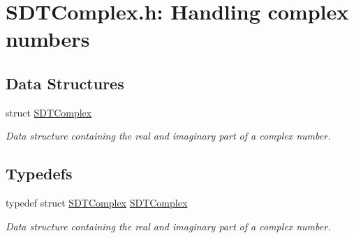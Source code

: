 \hypertarget{group__complex}{}\section{S\+D\+T\+Complex.\+h\+: Handling complex numbers}
\label{group__complex}
\subsection*{Data Structures}
\begin{DoxyCompactItemize}
\item 
struct \hyperlink{struct_s_d_t_complex}{S\+D\+T\+Complex}
\begin{DoxyCompactList}\small\item\em Data structure containing the real and imaginary part of a complex number. \end{DoxyCompactList}\end{DoxyCompactItemize}
\subsection*{Typedefs}
\begin{DoxyCompactItemize}
\item 
\hypertarget{group__complex_gabb05378b3dc6672fd924fc3033ffd55b}{}typedef struct \hyperlink{struct_s_d_t_complex}{S\+D\+T\+Complex} \hyperlink{group__complex_gabb05378b3dc6672fd924fc3033ffd55b}{S\+D\+T\+Complex}\label{group__complex_gabb05378b3dc6672fd924fc3033ffd55b}

\begin{DoxyCompactList}\small\item\em Data structure containing the real and imaginary part of a complex number. \end{DoxyCompactList}\end{DoxyCompactItemize}
